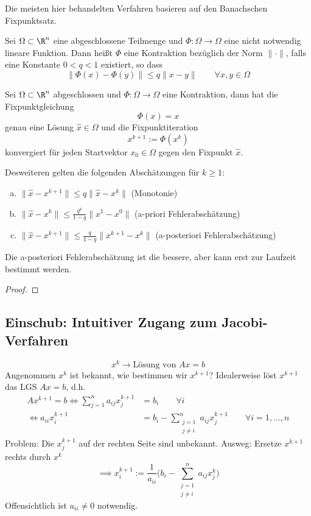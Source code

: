 \documentclass[a4paper]{scrartcl}
\numberwithin{equation}{section}
\begin{document}
Die meisten hier behandelten Verfahren basieren auf den Banachschen Fixpunktsatz.

\begin{df}[Kontraktion]
	\label{df:4.1}
	Sei $\Omega \subset \R^n$ eine abgeschlossene Teilmenge und $\Phi: \Omega \to \Omega$ eine nicht notwendig lineare Funktion.
	Dann heißt $\Phi$ eine Kontraktion bezüglich der Norm $\|\cdot\|$, falls eine Konstante $0<q<1$ existiert, so dass
	\[
		\|\Phi(x) - \Phi(y)\| \le q \|x-y\| \qquad \forall x,y\in \Omega
	\]
\end{df}

\begin{st}
	\label{st:4.2}
	Sei $\Omega \subset \R^n$ abgeschlossen und $\Phi: \Omega \to \Omega$ eine Kontraktion, dann hat die Fixpunktgleichung
	\[
		\Phi(x) = x
	\]
	genau eine Lösung $\hat x\in \Omega$ und die Fixpunktiteration
	\[
		x^{k+1} := \Phi(x^k)
	\]
	konvergiert für jeden Startvektor $x_0\in \Omega$ gegen den Fixpunkt $\hat x$.

	Desweiteren gelten die folgenden Abschätzungen für $k\ge 1$:
	\begin{enumerate}[a)]
		\item
			$\|\hat x-x^{k+1}\| \le q\|\hat x - x^k\|$ (Monotonie)
		\item
			$\|\hat x - x^{k}\| \le \frac {q^k}{1-q} \|x^1-x^0\|$ (a-priori Fehlerabschätzung)
		\item
			$\|\hat x - x^{k+1}\| \le \frac{q}{1-q} \|x^{k+1}-x^k\|$ (a-posteriori Fehlerabschätzung) 
	\end{enumerate}

	\begin{note}
		Die a-posteriori Fehlerabschätzung ist die bessere, aber kann erst zur Laufzeit bestimmt werden.
	\end{note}

	\begin{proof}
	\end{proof}
\end{st}


\subsection*{Einschub: Intuitiver Zugang zum Jacobi-Verfahren}

\[
	x^k \to \text{Lösung von $Ax=b$}
\]
Angenommen $x^k$ ist bekannt, wie bestimmen wir $x^{k+1}$?
Idealerweise löst $x^{k+1}$ das LGS $Ax=b$, d.h.
\begin{align*}
	Ax^{k+1} = b \iff \sum_{j=1}^n a_{ij}x_j^{k+1} &= b_i \qquad \forall i \\
	\iff a_{ii} x_i^{k+1} &= b_i - \sum_{\substack{j=1\\j\neq i}}^n a_{ij} x_j^{k+1} \qquad \forall i=1,\dotsc,n
\end{align*}
Problem: Die $x_j^{k+1}$ auf der rechten Seite sind unbekannt.
Ausweg: Ersetze $x^{k+1}$ rechts durch $x^k$
\[
	\implies x_i^{k+1} := \frac 1{a_{ii}} \bigg( b_i - \sum_{\substack{j=1\\j\neq i}}^n a_{ij}x_j^k\bigg)
\]
Offensichtlich ist $a_{ii}\neq 0$ notwendig.
\end{document}
